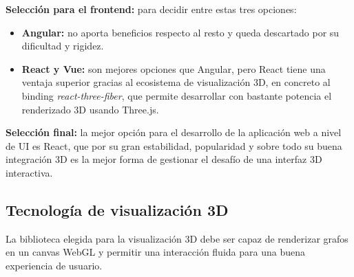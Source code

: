 \textbf{Selección para el frontend:} para decidir entre estas tres opciones:

\begin{itemize}
	\item \textbf{Angular:} no aporta beneficios respecto al resto y queda descartado por su
		dificultad y rigidez.
	\item \textbf{React y Vue:} son mejores opciones que Angular, pero React tiene una ventaja
		superior gracias al ecosistema de visualización 3D, en concreto al binding
		\textit{react-three-fiber}, que permite desarrollar con bastante potencia el
		renderizado 3D usando Three.js.
\end{itemize}

\textbf{Selección final:} la mejor opción para el desarrollo de la aplicación web a nivel de UI
es React, que por su gran estabilidad, popularidad y sobre todo su buena integración 3D es
la mejor forma de gestionar el desafío de una interfaz 3D interactiva.

\subsection{Tecnología de visualización 3D}

La biblioteca elegida para la visualización 3D debe ser capaz de renderizar grafos en un
canvas WebGL y permitir una interacción fluida para una buena experiencia de usuario.

